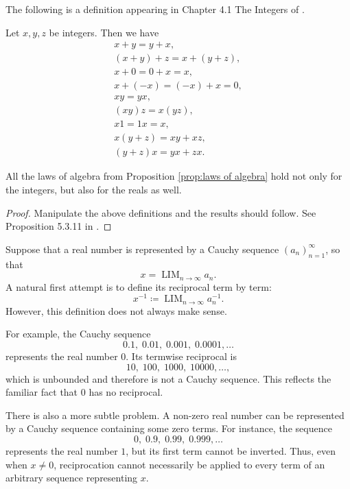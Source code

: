 {The following is a definition appearing in Chapter 4.1 The Integers of \cite{tao2022analysis}.

\begin{prop} \label{prop:laws of algebra}
Let \(x,y,z\) be integers. Then we have
\[
\begin{gathered}
x+y=y+x,\\[1.5ex]
(x+y)+z=x+(y+z),\\[1.5ex]
x+0=0+x=x,\\[1.5ex]
x+(-x)=(-x)+x=0,\\[3ex]
xy=yx,\\[1.5ex]
(xy)z=x(yz),\\[1.5ex]
x1=1x=x,\\[1.5ex]
x(y+z)=xy+xz,\\[1.5ex]
(y+z)x=yx+zx.
\end{gathered}
\]
\end{prop}


\begin{prop}
    All the laws of algebra from Proposition \ref{prop:laws of algebra} hold not only for the integers, but also for the reals as well. 
\end{prop}
\begin{proof}
    Manipulate the above definitions and the results should follow. See Proposition 5.3.11 in \cite{tao2022analysis}.
\end{proof}

\begin{rem}
Suppose that a real number is represented by a Cauchy sequence
$(a_n)_{n=1}^{\infty}$, so that
\[
x=\operatorname{LIM}_{n\to\infty}a_n.
\]
A natural first attempt is to define its reciprocal term by term:
\[
x^{-1}
\coloneqq
\operatorname{LIM}_{n\to\infty}a_n^{-1}.
\]
However, this definition does not always make sense.

For example, the Cauchy sequence
\[
0.1,\;0.01,\;0.001,\;0.0001,\ldots
\]
represents the real number $0$. Its termwise reciprocal is
\[
10,\;100,\;1000,\;10000,\ldots,
\]
which is unbounded and therefore is not a Cauchy sequence. This reflects
the familiar fact that $0$ has no reciprocal.

There is also a more subtle problem. A non-zero real number can be
represented by a Cauchy sequence containing some zero terms. For
instance, the sequence
\[
0,\;0.9,\;0.99,\;0.999,\ldots
\]
represents the real number $1$, but its first term cannot be inverted.
Thus, even when $x\neq 0$, reciprocation cannot necessarily be applied
to every term of an arbitrary sequence representing $x$.


\end{rem}}
